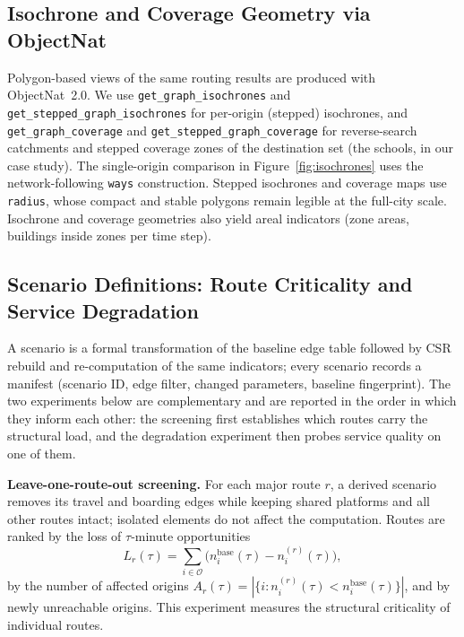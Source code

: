 \documentclass[smartcities,article,submit,moreauthors]{Definitions/mdpi}
\begin{document}
    \subsection{Isochrone and Coverage Geometry via ObjectNat}
    \label{subsec:objectnat}

    Polygon-based views of the same routing results are produced with ObjectNat~2.0.
    We use \texttt{get\_graph\_isochrones} and \texttt{get\_stepped\_graph\_isochrones} for per-origin
    (stepped) isochrones, and \texttt{get\_graph\_coverage} and \texttt{get\_stepped\_graph\_coverage}
    for reverse-search catchments and stepped coverage zones of the destination set (the schools, in
    our case study).
    The single-origin comparison in Figure~\ref{fig:isochrones} uses the network-following
    \texttt{ways} construction. Stepped isochrones and coverage maps use \texttt{radius}, whose compact
    and stable polygons remain legible at the full-city scale.
    Isochrone and coverage geometries also yield areal indicators (zone areas, buildings inside zones
    per time step).

    \subsection{Scenario Definitions: Route Criticality and Service Degradation}
    \label{subsec:scenarios}

    A scenario is a formal transformation of the baseline edge table followed by CSR rebuild and
    re-computation of the same indicators; every scenario records a manifest (scenario ID, edge filter, changed parameters, baseline fingerprint).
    The two experiments below are complementary and are reported in the order in which they inform
    each other: the screening first establishes which routes carry the structural load, and the
    degradation experiment then probes service quality on one of them.

    \textbf{Leave-one-route-out screening.}
    For each major route $r$, a derived scenario removes its travel and boarding edges while keeping
    shared platforms and all other routes intact; isolated elements do not affect the computation.
    Routes are ranked by the loss of $\tau$-minute opportunities
    \begin{equation}
        L_r(\tau) = \sum_{i \in \mathcal{O}} \bigl( n_i^{\mathrm{base}}(\tau) - n_i^{(r)}(\tau) \bigr),
    \end{equation}
    by the number of affected origins
    $A_r(\tau) = |\{ i : n_i^{(r)}(\tau) < n_i^{\mathrm{base}}(\tau) \}|$, and by newly unreachable
    origins.
    This experiment measures the structural criticality of individual routes.
\end{document}

